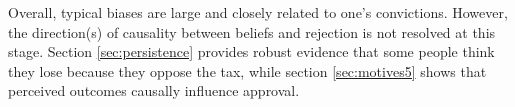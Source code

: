 \documentclass[12pt]{article} %
\begin{document}
Overall, typical biases are large and closely related to one's convictions. However, the direction(s) of causality between beliefs and rejection is not resolved at this stage. Section \ref{sec:persistence} provides robust evidence that some people think they lose because they oppose the tax, while section \ref{sec:motives5} shows that perceived outcomes causally influence approval.




\end{document}
